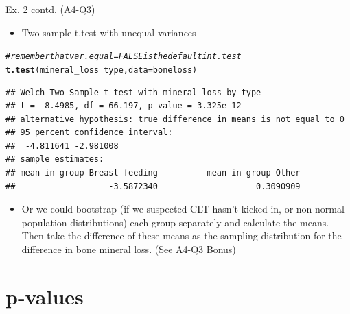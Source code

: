 \documentclass{beamer}\usepackage[]{graphicx}\usepackage[]{color}
\newcommand{\hlcom}[1]{\textcolor[rgb]{0.678,0.584,0.686}{\textit{#1}}}%
\newcommand{\hlopt}[1]{\textcolor[rgb]{0,0,0}{#1}}%
\newcommand{\hlstd}[1]{\textcolor[rgb]{0.345,0.345,0.345}{#1}}%
\newcommand{\hlkwc}[1]{\textcolor[rgb]{0.333,0.667,0.333}{#1}}%
\newcommand{\hlkwd}[1]{\textcolor[rgb]{0.737,0.353,0.396}{\textbf{#1}}}%
\newenvironment{knitrout}{}{} %
\begin{document}
\begin{frame}[fragile]{Ex. 2 contd. (A4-Q3)}
\begin{itemize}
	\small
	\setlength\itemsep{1em}
	\item  Two-sample t.test with unequal variances
\end{itemize}

\begin{knitrout}\tiny
{}\color{fgcolor}
\begin{alltt}
\hlcom{# remember that var.equal=FALSE is the default in t.test }
\hlkwd{t.test}\hlstd{(mineral_loss} \hlopt{~} \hlstd{type,} \hlkwc{data} \hlstd{= boneloss)}
\end{alltt}
\begin{verbatim}
## Welch Two Sample t-test with mineral_loss by type 
## t = -8.4985, df = 66.197, p-value = 3.325e-12
## alternative hypothesis: true difference in means is not equal to 0 
## 95 percent confidence interval:
##  -4.811641 -2.981008 
## sample estimates:
## mean in group Breast-feeding          mean in group Other 
##                   -3.5872340                    0.3090909
\end{verbatim}

\end{knitrout}

\pause 
\begin{itemize}
	\small
	\setlength\itemsep{1em}
	\item  Or we could bootstrap (if we suspected CLT hasn't kicked in, or non-normal population distributions) each group separately and calculate the means. Then take the difference of these means as the sampling distribution for the difference in bone mineral loss. (See A4-Q3 Bonus)
\end{itemize}

\end{frame}


\section{p-values}
\end{document}

